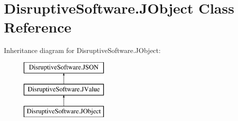 \hypertarget{class_disruptive_software_1_1_j_object}{\section{Disruptive\+Software.\+J\+Object Class Reference}
\label{class_disruptive_software_1_1_j_object}
}
Inheritance diagram for Disruptive\+Software.\+J\+Object\+:\begin{figure}[H]
\begin{center}
\leavevmode
\includegraphics[height=3.000000cm]{class_disruptive_software_1_1_j_object}
\end{center}
\end{figure}
